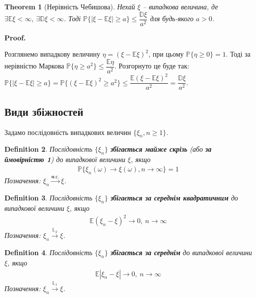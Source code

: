 \documentclass[a4paper, 10pt]{article}
\makeatletter
\theoremstyle{theoremdd}
\newtheorem{theorem}{Theorem}[subsection]
\newtheorem{definition}[theorem]{Definition}
\renewenvironment{proof}[1][Proof.\\]{\par
\pushQED{\hfill \qed}%
\normalfont \topsep6\p@\@plus6\p@\relax
\trivlist
\item\relax
{\bfseries
#1\@addpunct{.}}\hspace\labelsep\ignorespaces
}{%
\popQED\endtrivlist\@endpefalse
}
\newcommand{\toalmostsurely}{\overset{\text{м.с.}}{\to}}
\newcommand{\toltwo}{\overset{\mathbb{L}_2}{\to}}
\newcommand{\tolone}{\overset{\mathbb{L}_1}{\to}}
\makeatother
\begin{document}
\begin{theorem}[Нерівність Чебишова]
Нехай $\xi$ -- випадкова величина, де $\exists \mathbb{E}\xi < \infty,\ \exists \mathbb{D}\xi < \infty$. Тоді $\mathbb{P}\{ |\xi - \mathbb{E}\xi| \geq a \} \leq \dfrac{\mathbb{D}\xi}{a^2}$ для будь-якого $a > 0$.
\end{theorem}

\begin{proof}
Розглянемо випадкову величину $\eta = (\xi - \mathbb{E}\xi)^2$, при цьому $\mathbb{P}\{\eta \geq 0 \} = 1$. Тоді за нерівністю Маркова $\mathbb{P}\{\eta \geq a^2\} \leq \dfrac{\mathbb{E}\eta}{a^2}$. Розгорнуто це буде так:\\
$\mathbb{P}\{ |\xi - \mathbb{E}\xi| \geq a\} = \mathbb{P}\{ (\xi-\mathbb{E}\xi)^2 \geq a^2 \} \leq \dfrac{\mathbb{E}(\xi - \mathbb{E}\xi)^2}{a^2} = \dfrac{\mathbb{D}\xi}{a^2}$.
\end{proof}

\subsection{Види збіжностей}
Задамо послідовність випадкових величин $\{\xi_n, n \geq 1\}$.

\begin{definition}
Послідовність $\{\xi_n\}$ \textbf{збігається майже скрізь} (або \textbf{за ймовірністю 1}) до випадкової величини $\xi$, якщо
\begin{align*}
\mathbb{P}\{ \xi_n(\omega) \to \xi(\omega), n \to \infty \} = 1
\end{align*}
Позначення: $\xi_n \toalmostsurely \xi$.
\end{definition}

\begin{definition}
Послідовність $\{\xi_n\}$ \textbf{збігається за середнім квадратичним} до випадкової величини $\xi$, якщо
\begin{align*}
\mathbb{E}(\xi_n - \xi)^2 \to 0,\ n \to \infty
\end{align*}
Позначення: $\xi_n \toltwo \xi$.
\end{definition}

\begin{definition}
Послідовність $\{\xi_n\}$ \textbf{збігається за середнім} до випадкової величини $\xi$, якщо
\begin{align*}
\mathbb{E}|\xi_n - \xi| \to 0,\ n \to \infty
\end{align*}
Позначення: $\xi_n \tolone \xi$.
\end{definition}
\end{document}
